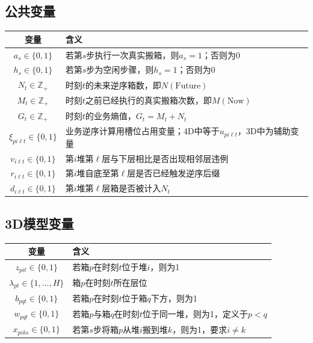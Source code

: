 \documentclass[11pt,a4paper]{ctexart}
\begin{document}
\subsection{公共变量}
\begin{table}[H]
\centering
\renewcommand{\arraystretch}{1.35}
\begin{tabularx}{0.92\textwidth}{>{\bfseries}c >{\raggedright\arraybackslash}X}
\toprule
变量 & 含义 \\
\midrule
$a_s \in \{0,1\}$ & 若第$s$步执行一次真实搬箱，则$a_s=1$；否则为0 \\
$h_s \in \{0,1\}$ & 若第$s$步为空闲步骤，则$h_s=1$；否则为0 \\
$N_t \in \mathbb{Z}_{+}$ & 时刻$t$的未来逆序箱数，即$N(\mathrm{Future})$ \\
$M_t \in \mathbb{Z}_{+}$ & 时刻$t$之前已经执行的真实搬箱次数，即$M(\mathrm{Now})$ \\
$G_t \in \mathbb{Z}_{+}$ & 时刻$t$的业务熵值，$G_t=M_t+N_t$ \\
$\xi_{pi\ell t}\in\{0,1\}$ & 业务逆序计算用槽位占用变量；4D中等于$u_{pi\ell t}$，3D中为辅助变量 \\
$v_{i\ell t}\in\{0,1\}$ & 第$i$堆第$\ell$层与下层相比是否出现相邻层违例 \\
$r_{i\ell t}\in\{0,1\}$ & 第$i$堆自底至第$\ell$层是否已经触发逆序后缀 \\
$d_{i\ell t}\in\{0,1\}$ & 第$i$堆第$\ell$层箱是否被计入$N_t$ \\
\bottomrule
\end{tabularx}
\end{table}

\subsection{3D模型变量}
\begin{table}[H]
\centering
\renewcommand{\arraystretch}{1.35}
\begin{tabularx}{0.92\textwidth}{>{\bfseries}c >{\raggedright\arraybackslash}X}
\toprule
变量 & 含义 \\
\midrule
$z_{pit} \in \{0,1\}$ & 若箱$p$在时刻$t$位于堆$i$，则为1 \\
$\lambda_{pt} \in \{1,\ldots,H\}$ & 箱$p$在时刻$t$所在层位 \\
$b_{pqt} \in \{0,1\}$ & 若箱$p$在时刻$t$位于箱$q$下方，则为1 \\
$w_{pqt} \in \{0,1\}$ & 若箱$p$与箱$q$在时刻$t$位于同一堆，则为1，定义于$p<q$ \\
$x_{piks} \in \{0,1\}$ & 若第$s$步将箱$p$从堆$i$搬到堆$k$，则为1，要求$i\ne k$ \\
\bottomrule
\end{tabularx}
\end{table}
\end{document}
